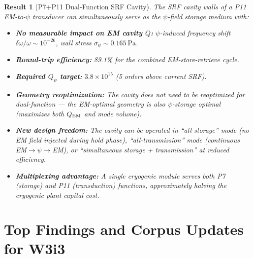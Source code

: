 \documentclass[aps,prd,twocolumn,superscriptaddress]{revtex4-2}
\newtheorem{result}{Result}
\begin{document}
\begin{result}[P7+P11 Dual-Function SRF Cavity]
\label{res:dual}
The SRF cavity walls of a P11 EM-to-$\psi$ transducer can simultaneously
serve as the $\psi$-field storage medium with:
\begin{itemize}
\item \textbf{No measurable impact on EM cavity $Q$:} $\psi$-induced
frequency shift $\delta\omega/\omega \sim 10^{-26}$, wall stress
$\sigma_\psi \sim 0.165~\mathrm{Pa}$.
\item \textbf{Round-trip efficiency:} 89.1\% for the combined
EM-store-retrieve cycle.
\item \textbf{Required $Q_\psi$ target:} $3.8\times 10^{15}$
(5 orders above current SRF).
\item \textbf{Geometry reoptimization:} The cavity does not need to be
reoptimized for dual-function --- the EM-optimal geometry is also
$\psi$-storage optimal (maximizes both $Q_{\rm EM}$ and mode volume).
\item \textbf{New design freedom:} The cavity can be operated in
``all-storage'' mode (no EM field injected during hold phase),
``all-transmission'' mode (continuous EM$\to\psi\to$EM), or
``simultaneous storage + transmission'' at reduced efficiency.
\item \textbf{Multiplexing advantage:} A single cryogenic module
serves both P7 (storage) and P11 (transduction) functions,
approximately halving the cryogenic plant capital cost.
\end{itemize}
\end{result}

\section{Top Findings and Corpus Updates for W3i3}
\label{sec:top}
\end{document}
